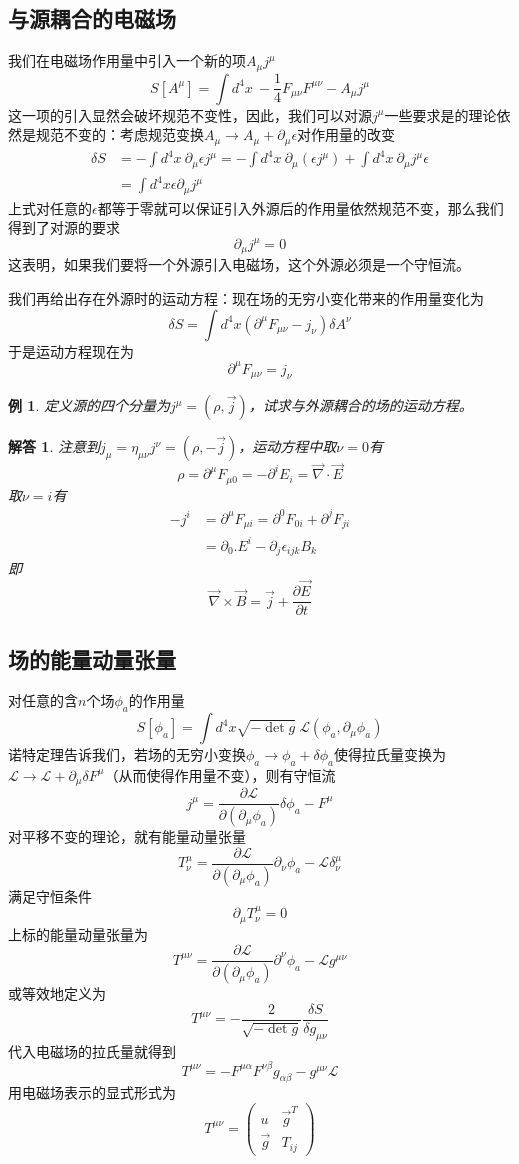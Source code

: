\documentclass[a4paper,11pt]{ctexbook}
\newtheorem{eg}{例}[section]
\newtheorem{ans}{解答}[section]
\newcommand{\beq}{\begin{equation}}
\newcommand{\eeq}{\end{equation}}
\newcommand{\bea}{\begin{equation}\begin{aligned}}
\newcommand{\eea}{\end{aligned}\end{equation}}
\newcommand{\lag}{\mathcal{L}}
\newcommand{\del}{\vec{\nabla}}
\newcommand{\pfrac}[2]{\frac{\partial #1}{\partial #2}}
\newcommand{\mat}[1]{\begin{pmatrix} #1 \end{pmatrix}}
\begin{document}
\subsection{与源耦合的电磁场}
我们在电磁场作用量中引入一个新的项$A_\mu j^\mu$
\beq
S[A^\mu] = \int d^4 x \ -\frac{1}{4} F_{\mu\nu}F^{\mu \nu} - A_\mu j^\mu
\eeq
这一项的引入显然会破坏规范不变性，因此，我们可以对源$j^\mu$一些要求是的理论依然是规范不变的：考虑规范变换$A_\mu \to A_\mu + \partial_\mu \epsilon$对作用量的改变
\bea
\delta S &= -\int d^4 x\ \partial_\mu \epsilon j^\mu = -\int d^4 x\ \partial_\mu(\epsilon j^\mu) + \int d^4 x\ \partial_\mu j^\mu \epsilon \\
&= \int d^4 x \epsilon \partial_\mu j^\mu
\eea
上式对任意的$\epsilon$都等于零就可以保证引入外源后的作用量依然规范不变，那么我们得到了对源的要求
\beq
\partial_\mu j^\mu = 0
\eeq
这表明，如果我们要将一个外源引入电磁场，这个外源必须是一个守恒流。
\par
我们再给出存在外源时的运动方程：现在场的无穷小变化带来的作用量变化为
\beq
\delta S = \int d^4 x (\partial^\mu F_{\mu \nu} - j_\nu) \delta A^\nu
\eeq
于是运动方程现在为
\beq
\partial^\mu F_{\mu \nu} = j_\nu
\eeq
\begin{eg}
定义源的四个分量为$j^\mu = (\rho,\vec j)$，试求与外源耦合的场的运动方程。
\end{eg}
\begin{ans}
注意到$j_\mu = \eta_{\mu \nu}j^\nu = (\rho,-\vec j)$，运动方程中取$\nu = 0$有
\beq
\rho = \partial^\mu F_{\mu 0} = -\partial^i E_i = \del \cdot \vec E
\eeq
取$\nu = i$有
\bea
-j^i &= \partial^\mu F_{\mu i} = \partial^0 F_{0i} + \partial^j F_{ji} \\
&=\partial_0.E^i - \partial_j \epsilon_{ijk} B_k
\eea
即
\beq
\del \times \vec B = \vec j + \pfrac{\vec E}{t}
\eeq
\end{ans}

\subsection{场的能量动量张量}
对任意的含$n$个场$\phi_a$的作用量
\beq
S[\phi_a] = \int d^4 x\sqrt{-\det g} \ \lag(\phi_a,\partial_\mu \phi_a)
\eeq
诺特定理告诉我们，若场的无穷小变换$\phi_a \to \phi_a + \delta \phi_a$使得拉氏量变换为$\lag \to \lag + \partial_\mu \delta F^\mu$（从而使得作用量不变），则有守恒流
\beq
j^\mu = \pfrac{\lag}{(\partial_\mu \phi_a)} \delta \phi_a - F^\mu
\eeq
对平移不变的理论，就有能量动量张量
\beq
T^\mu_\nu = \pfrac{\lag}{(\partial_\mu \phi_a)} \partial_\nu \phi_a - \lag \delta^\mu_\nu
\eeq
满足守恒条件
\beq
\partial_\mu T^\mu_\nu = 0
\eeq
上标的能量动量张量为
\beq
T^{\mu \nu} = \pfrac{\lag}{(\partial_\mu \phi_a)} \partial^\nu \phi_a - \lag g^{\mu \nu}
\eeq
或等效地定义为
\beq
T^{\mu \nu} =- \frac{2}{\sqrt{-\det g}} \frac{\delta S}{\delta g_{\mu \nu}}
\eeq
代入电磁场的拉氏量就得到
\beq
T^{\mu \nu} = -F^{\mu \alpha} F^{\nu \beta} g_{\alpha \beta} - g^{\mu \nu} \lag
\eeq
用电磁场表示的显式形式为
\beq
T^{\mu \nu} = \mat{u & \vec g^T  \\
\vec g &  T_{ij} }
\eeq
\end{document}
